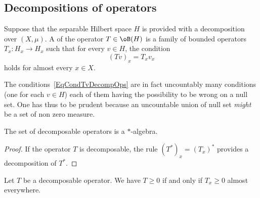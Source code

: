 					\subsection{Decompositions of operators}



Suppose that the separable Hilbert space $H$ is provided with a decomposition over $(X,\mu)$. A  of the operator $T\in \oB(H)$ is a family of bounded operators $T_x\colon H_x\to H_x$ such that for every $v\in H$, the condition
\begin{equation}		\label{EqCondTvDecompOps}
	(Tv)_x=T_xv_x
\end{equation}
holds for almost every $x\in X$.

\begin{remark}
The conditions~\ref{EqCondTvDecompOps} are in fact uncountably many conditions (one for each $v\in H$) each of them having the possibility to be wrong on a null set. One has thus to be prudent because an uncountable union of null set \emph{might} be a set of non zero measure.
\end{remark}


\begin{lemma}
The set of decomposable operators is a $*$-algebra.
\end{lemma}

\begin{proof}
If the operator $T$ is decomposable, the rule $(T^*)_x=(T_x)^*$ provides a decomposition of $T^*$.
\end{proof}

\begin{lemma}
Let $T$ be a decomposable operator. We have $T\geq 0$ if and only if $T_x\geq 0$ almost everywhere.
\end{lemma}

